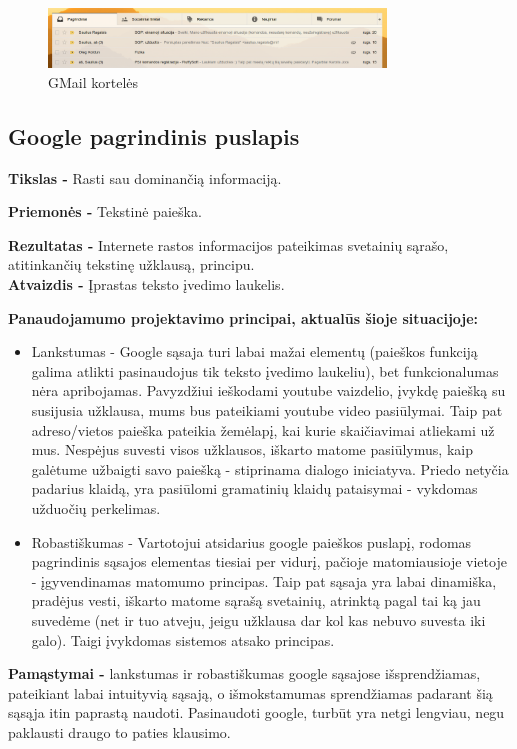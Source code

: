 ﻿\documentclass[a4paper, 12pt]{article}
\begin{document}
		\begin{figure}[h]
		\centering
		\includegraphics[width=0.8\textwidth]{images/korteles.png}
		\caption{GMail kortelės}
		\label{korteles}
		\end{figure}

	\subsection{Google pagrindinis puslapis}
		\textbf{Tikslas -}
		Rasti sau dominančią informaciją.

		\textbf{Priemonės -}
		Tekstinė paieška.
		
		\textbf{Rezultatas -}
		Internete rastos informacijos pateikimas svetainių sąrašo, atitinkančių tekstinę užklausą, principu.\\
		
		\textbf{Atvaizdis -}
		Įprastas teksto įvedimo laukelis.

		\textbf{Panaudojamumo projektavimo principai, aktualūs šioje situacijoje:}
		\begin{itemize}
		\item Lankstumas - Google sąsaja turi labai mažai elementų (paieškos funkciją galima atlikti pasinaudojus tik teksto įvedimo laukeliu), bet funkcionalumas nėra apribojamas.
		Pavyzdžiui ieškodami youtube vaizdelio, įvykdę paiešką su susijusia užklausa, mums bus pateikiami youtube video pasiūlymai.
		Taip pat adreso/vietos paieška pateikia žemėlapį, kai kurie skaičiavimai atliekami už mus.
		Nespėjus suvesti visos užklausos, iškarto matome pasiūlymus, kaip galėtume užbaigti savo paiešką - stiprinama dialogo iniciatyva.
		Priedo netyčia padarius klaidą, yra pasiūlomi gramatinių klaidų pataisymai - vykdomas užduočių perkelimas.
		\item Robastiškumas - Vartotojui atsidarius google paieškos puslapį, rodomas pagrindinis sąsajos elementas tiesiai per vidurį, pačioje matomiausioje vietoje - įgyvendinamas matomumo principas.
		Taip pat sąsaja yra labai dinamiška, pradėjus vesti, iškarto matome sąrašą svetainių, atrinktą pagal tai ką jau suvedėme (net ir tuo atveju, jeigu užklausa dar kol kas nebuvo suvesta iki galo).
		Taigi įvykdomas sistemos atsako principas.
		\end{itemize}

		\textbf{Pamąstymai -}
		lankstumas ir robastiškumas google sąsajose išsprendžiamas, pateikiant labai intuityvią sąsają, o išmokstamumas sprendžiamas padarant šią sąsąja itin paprastą naudoti.
		Pasinaudoti google, turbūt yra netgi lengviau, negu paklausti draugo to paties klausimo.
\end{document}
